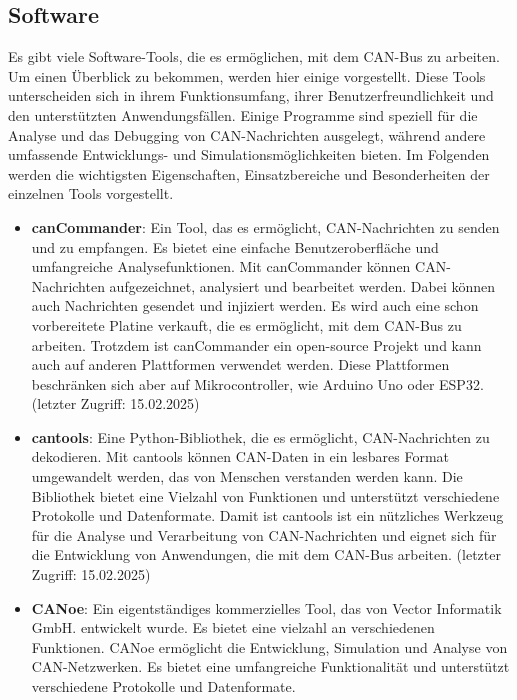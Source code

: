 \subsection{Software}
Es gibt viele Software-Tools, die es ermöglichen, mit dem CAN-Bus zu arbeiten. Um einen Überblick zu bekommen, 
werden hier einige vorgestellt. Diese Tools unterscheiden sich in ihrem Funktionsumfang, ihrer Benutzerfreundlichkeit 
und den unterstützten Anwendungsfällen. Einige Programme sind speziell für die Analyse und das Debugging von CAN-Nachrichten 
ausgelegt, während andere umfassende Entwicklungs- und Simulationsmöglichkeiten bieten. Im Folgenden werden die wichtigsten 
Eigenschaften, Einsatzbereiche und Besonderheiten der einzelnen Tools vorgestellt. \\
\begin{itemize}
    \item \textbf{canCommander}: Ein Tool, das es ermöglicht, CAN-Nachrichten zu senden und zu empfangen. Es bietet eine einfache 
    Benutzeroberfläche und umfangreiche Analysefunktionen. Mit canCommander können CAN-Nachrichten aufgezeichnet, 
    analysiert und bearbeitet werden. Dabei können auch Nachrichten gesendet und injiziert werden. Es wird auch eine
    schon vorbereitete Platine verkauft, die es ermöglicht, mit dem CAN-Bus zu arbeiten. Trotzdem ist canCommander ein
    open-source Projekt und kann auch auf anderen Plattformen verwendet werden. Diese Plattformen beschränken sich aber
    auf Mikrocontroller, wie Arduino Uno oder ESP32. \cite{can_commander} (letzter Zugriff: 15.02.2025)
    \item \textbf{cantools}: Eine Python-Bibliothek, die es ermöglicht, CAN-Nachrichten zu dekodieren. Mit cantools können 
    CAN-Daten in ein lesbares Format umgewandelt werden, das von Menschen verstanden werden kann. Die Bibliothek 
    bietet eine Vielzahl von Funktionen und unterstützt verschiedene Protokolle und Datenformate. Damit ist cantools ist ein 
    nützliches Werkzeug für die Analyse und Verarbeitung von CAN-Nachrichten und eignet sich für die Entwicklung von 
    Anwendungen, die mit dem CAN-Bus arbeiten. \cite{cantools} (letzter Zugriff: 15.02.2025)
    \item \textbf{CANoe}: Ein eigentständiges kommerzielles Tool, das von Vector Informatik GmbH. entwickelt wurde. 
    Es bietet eine vielzahl an verschiedenen Funktionen. CANoe ermöglicht die Entwicklung, Simulation und Analyse von
    CAN-Netzwerken. Es bietet eine umfangreiche Funktionalität und unterstützt verschiedene Protokolle und Datenformate.

\end{itemize}
